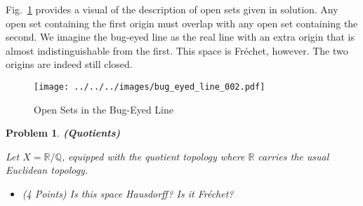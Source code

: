 \documentclass{article}
\theoremstyle{normal}
\newtheorem{problem}{Problem}
\begin{document}
    Fig.~\ref{fig:bug_eyed_line_open} provides a visual of the description of
    open sets given in solution. Any open set containing the first origin
    must overlap with any open set containing the second. We imagine the
    bug-eyed line as the real line with an extra origin that is almost
    indistinguishable from the first. This space is Fr\'{e}chet, however.
    The two origins are indeed still closed.
    \begin{figure}
        \centering
        \texttt{[image: ../../../images/bug\_eyed\_line\_002.pdf]}
        \caption{Open Sets in the Bug-Eyed Line}
        \label{fig:bug_eyed_line_open}
    \end{figure}
    \newpage
    \color{blue}
    \begin{problem}
        \textbf{(Quotients)}
        \par\hfill\par
        Let $X=\mathbb{R}/\mathbb{Q}$, equipped with the quotient topology where
        $\mathbb{R}$ carries the usual Euclidean topology.
        \begin{itemize}
            \item (4 Points) Is this space Hausdorff? Is it Fr\'{e}chet?
        \end{itemize}
    \end{problem}
    \color{black}
\end{document}

